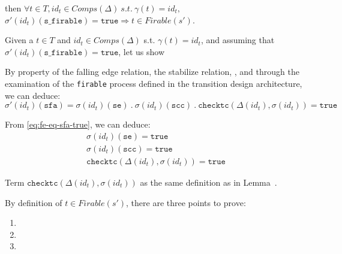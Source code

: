 \documentclass[dvipsnames,12pt]{article}
\begin{document}
\begin{lemma}
  \label{lem:fe-equal-firable-2}
  \fehyps{} then
  $\forall{}t\in{}T,id_t\in{}Comps(\Delta)~s.t.~\gamma(t)=id_t,$
  $\sigma'(id_t)(\texttt{s\_firable})=\mathtt{true}\Rightarrow{}t\in{}Firable(s')$.
\end{lemma}

\begin{niproof}

  Given a $t\in{}T$ and $id_t\in{}Comps(\Delta)$
  s.t. $\gamma(t)=id_t$, and assuming that
  $\sigma'(id_t)(\texttt{s\_firable})=\mathtt{true}$, let us
  show \\
  
  \exT{}

  By property of the \hvhdl{} falling edge relation, the stabilize
  relation, \InCsCompT, and through the examination of the
  \texttt{firable} process defined in the transition design
  architecture, we can deduce:
  \begin{equation}
    \label{eq:fe-eq-sfa-true}
    \sigma'(id_t)(\texttt{sfa})=\sigma(id_t)(\texttt{se})~.~\sigma(id_t)(\texttt{scc})~.~\mathtt{checktc}(\Delta(id_t),\sigma(id_t))=\mathtt{true}
  \end{equation}

  From \eqref{eq:fe-eq-sfa-true}, we can deduce:
  \begin{eqnarray}
    \label{eq:fe-eq-se-true}\sigma(id_t)(\texttt{se})=\mathtt{true}\\
    \label{eq:fe-eq-scc-true}\sigma(id_t)(\texttt{scc})=\mathtt{true}\\
    \label{eq:fe-eq-checktc-true}\mathtt{checktc}(\Delta(id_t),\sigma(id_t))=\mathtt{true}
  \end{eqnarray}

  Term $\mathtt{checktc}(\Delta(id_t),\sigma(id_t))$ as the same
  definition as in Lemma~.

  By definition of $t\in{}Firable(s')$, there are three points to prove:
  \begin{enumerate}
  \item {}
  \item
  \item {}
  \end{enumerate}


\end{niproof}
\end{document}
